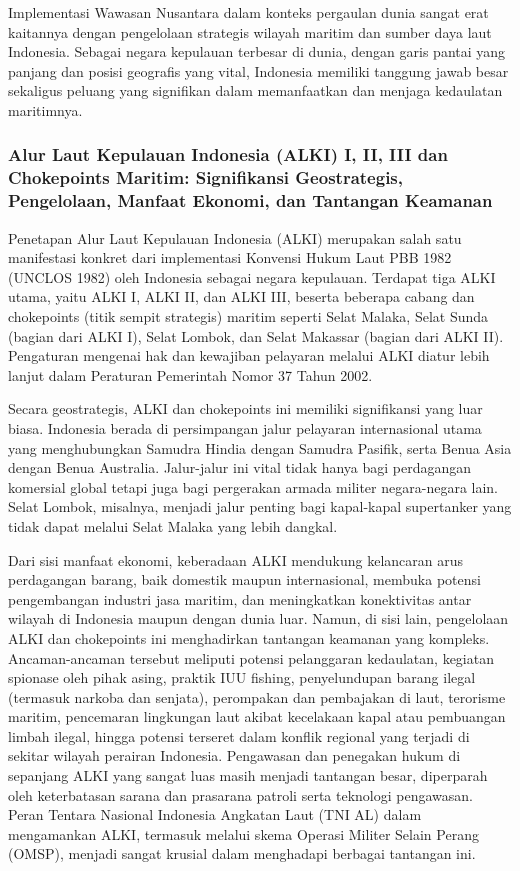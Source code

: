 \documentclass[12pt, a4paper]{article}
\begin{document}
Implementasi Wawasan Nusantara dalam konteks pergaulan dunia sangat erat kaitannya dengan pengelolaan strategis wilayah maritim dan sumber daya laut Indonesia. Sebagai negara kepulauan terbesar di dunia, dengan garis pantai yang panjang dan posisi geografis yang vital, Indonesia memiliki tanggung jawab besar sekaligus peluang yang signifikan dalam memanfaatkan dan menjaga kedaulatan maritimnya.
\subsubsection*{Alur Laut Kepulauan Indonesia (ALKI) I, II, III dan Chokepoints Maritim: Signifikansi Geostrategis, Pengelolaan, Manfaat Ekonomi, dan Tantangan Keamanan}

Penetapan Alur Laut Kepulauan Indonesia (ALKI) merupakan salah satu manifestasi konkret dari implementasi Konvensi Hukum Laut PBB 1982 (UNCLOS 1982) oleh Indonesia sebagai negara kepulauan. Terdapat tiga ALKI utama, yaitu ALKI I, ALKI II, dan ALKI III, beserta beberapa cabang dan chokepoints (titik sempit strategis) maritim seperti Selat Malaka, Selat Sunda (bagian dari ALKI I), Selat Lombok, dan Selat Makassar (bagian dari ALKI II). Pengaturan mengenai hak dan kewajiban pelayaran melalui ALKI diatur lebih lanjut dalam Peraturan Pemerintah Nomor 37 Tahun 2002.  

Secara geostrategis, ALKI dan chokepoints ini memiliki signifikansi yang luar biasa. Indonesia berada di persimpangan jalur pelayaran internasional utama yang menghubungkan Samudra Hindia dengan Samudra Pasifik, serta Benua Asia dengan Benua Australia. Jalur-jalur ini vital tidak hanya bagi perdagangan komersial global tetapi juga bagi pergerakan armada militer negara-negara lain. Selat Lombok, misalnya, menjadi jalur penting bagi kapal-kapal supertanker yang tidak dapat melalui Selat Malaka yang lebih dangkal.  

Dari sisi manfaat ekonomi, keberadaan ALKI mendukung kelancaran arus perdagangan barang, baik domestik maupun internasional, membuka potensi pengembangan industri jasa maritim, dan meningkatkan konektivitas antar wilayah di Indonesia maupun dengan dunia luar. Namun, di sisi lain, pengelolaan ALKI dan chokepoints ini menghadirkan tantangan keamanan yang kompleks. Ancaman-ancaman tersebut meliputi potensi pelanggaran kedaulatan, kegiatan spionase oleh pihak asing, praktik IUU fishing, penyelundupan barang ilegal (termasuk narkoba dan senjata), perompakan dan pembajakan di laut, terorisme maritim, pencemaran lingkungan laut akibat kecelakaan kapal atau pembuangan limbah ilegal, hingga potensi terseret dalam konflik regional yang terjadi di sekitar wilayah perairan Indonesia. Pengawasan dan penegakan hukum di sepanjang ALKI yang sangat luas masih menjadi tantangan besar, diperparah oleh keterbatasan sarana dan prasarana patroli serta teknologi pengawasan. Peran Tentara Nasional Indonesia Angkatan Laut (TNI AL) dalam mengamankan ALKI, termasuk melalui skema Operasi Militer Selain Perang (OMSP), menjadi sangat krusial dalam menghadapi berbagai tantangan ini.  
\end{document}
